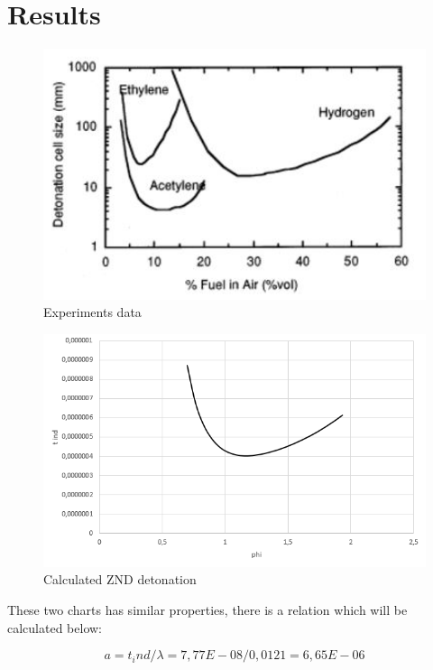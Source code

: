 \documentclass[a4paper]{article}
\begin{document}
\section{Results}\label{sec:results}

\begin{figure}[H]
\includegraphics[width=1\textwidth]{cellsize.JPG}
\caption{\label{fig:cj}Experiments data}
\end{figure}

\begin{figure}[H]
\includegraphics[width=1\textwidth]{ZND_KU.JPG}
\caption{\label{fig:p}Calculated ZND detonation}
\end{figure}

These two charts has similar properties, there is a relation which will be calculated below:

\begin{equation}
    a = t_ind/\lambda=7,77E-08/0,0121=6,65E-06
 \end{equation}   
\end{document}
